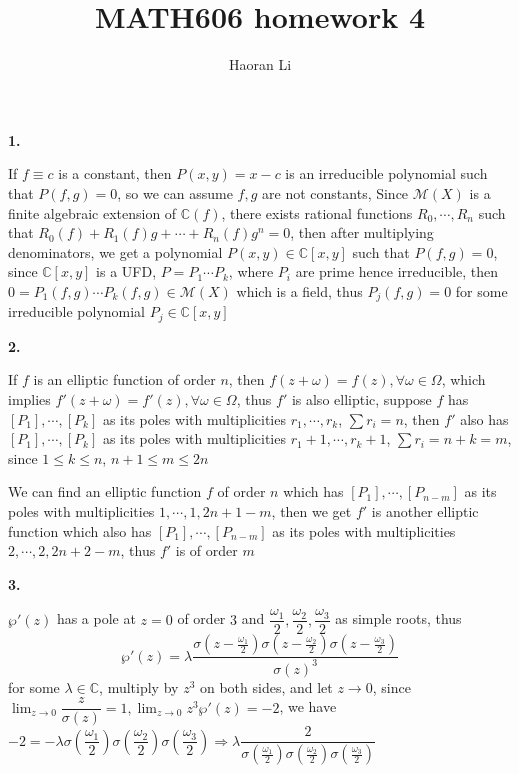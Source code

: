 \documentclass[12pt]{article}
\title{MATH606 homework 4}
\author{Haoran Li}
\date{}
\begin{document}
\maketitle

\textbf{1.} \par
If $f\equiv c$ is a constant, then $P(x,y)=x-c$ is an irreducible polynomial such that $P(f,g)=0$, so we can assume $f,g$ are not constants, Since $\mathcal{M}(X)$ is a finite algebraic extension of $\mathbb{C}(f)$, there exists rational functions $R_0,\cdots,R_n$ such that $R_0(f)+R_1(f)g+\cdots+R_n(f)g^n=0$, then after multiplying denominators, we get a polynomial $P(x,y)\in \mathbb{C}[x,y]$ such that $P(f,g)=0$, since $\mathbb{C}[x,y]$ is a UFD, $P=P_1\cdots P_k$, where $P_i$ are prime hence irreducible, then $0=P_1(f,g)\cdots P_k(f,g)\in \mathcal{M}(X)$ which is a field, thus $P_j(f,g)=0$ for some irreducible polynomial $P_j\in \mathbb{C}[x,y]$ \par
\textbf{2.} \par
If $f$ is an elliptic function of order $n$, then $f(z+\omega)=f(z), \forall \omega\in\Omega$, which implies $f'(z+\omega)=f'(z), \forall \omega\in\Omega$, thus $f'$ is also elliptic, suppose $f$ has $[P_1],\cdots,[P_{k}]$ as its poles with multiplicities $r_1,\cdots,r_k$, $\sum r_i=n$, then $f'$ also has $[P_1],\cdots,[P_{k}]$ as its poles with multiplicities $r_1+1,\cdots,r_k+1$, $\sum r_i=n+k=m$, since $1\leq k\leq n$, $n+1\leq m\leq 2n$ \par
We can find an elliptic function $f$ of order $n$ which has $[P_1],\cdots,[P_{n-m}]$ as its poles with multiplicities $1,\cdots,1,2n+1-m$, then we get $f'$ is another elliptic function which also has $[P_1],\cdots,[P_{n-m}]$ as its poles with multiplicities $2,\cdots,2,2n+2-m$, thus $f'$ is of order $m$ \par
\textbf{3.} \par
$\wp'(z)$ has a pole at $z=0$ of order $3$ and $\dfrac{\omega_1}{2},\dfrac{\omega_2}{2},\dfrac{\omega_3}{2}$ as simple roots, thus \[
\wp'(z)=\lambda\dfrac{\sigma\left(z-\frac{\omega_1}{2}\right)\sigma\left(z-\frac{\omega_2}{2}\right)\sigma\left(z-\frac{\omega_3}{2}\right)}{\sigma(z)^3}\] for some $\lambda\in\mathbb{C}$, multiply by $z^3$ on both sides, and let $z\rightarrow 0$, since $\displaystyle\lim_{z\rightarrow 0}\dfrac{z}{\sigma(z)}=1, \lim_{z\rightarrow 0}z^3\wp'(z)=-2$, we have $-2=-\lambda\sigma\left(\dfrac{\omega_1}{2}\right)\sigma\left(\dfrac{\omega_2}{2}\right)\sigma\left(\dfrac{\omega_3}{2}\right)\Rightarrow \lambda \dfrac{2}{\sigma\left(\frac{\omega_1}{2}\right)\sigma\left(\frac{\omega_2}{2}\right)\sigma\left(\frac{\omega_3}{2}\right)}$\par
\end{document}
